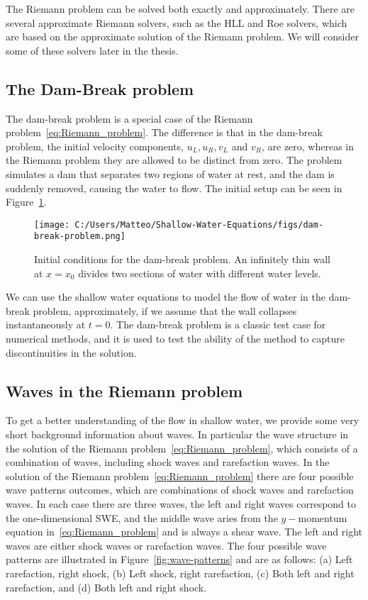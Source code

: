 The Riemann problem can be solved both exactly and approximately.
There are several approximate Riemann solvers, such as the HLL and Roe solvers, which are based on the approximate solution of the Riemann problem.
We will consider some of these solvers later in the thesis.


\subsection{The Dam-Break problem}
The dam-break problem is a special case of the Riemann problem~\eqref{eq:Riemann_problem}.
The difference is that in the dam-break problem, the initial velocity components, $u_L, u_R, v_L$ and $v_R$, are zero, whereas in the Riemann problem they are allowed to be distinct from zero.
The problem simulates a dam that separates two regions of water at rest, and the dam is suddenly removed, causing the water to flow.
The initial setup can be seen in Figure~\ref{fig:dam-break-problem}.
\begin{figure}[H]
    \centering
    \texttt{[image: C:/Users/Matteo/Shallow-Water-Equations/figs/dam-break-problem.png]}
    \caption{Initial conditions for the dam-break problem. An infinitely thin wall at $x=x_0$ divides two sections of water with different water levels.}\label{fig:dam-break-problem}
\end{figure}
We can use the shallow water equations to model the flow of water in the dam-break problem, approximately, if we assume that the wall collapses instantaneously at $t=0$.
The dam-break problem is a classic test case for numerical methods, and it is used to test the ability of the method to capture discontinuities in the solution.

\subsection{Waves in the Riemann problem}
To get a better understanding of the flow in shallow water, we provide some very short background information about waves.
In particular the wave structure in the solution of the Riemann problem~\eqref{eq:Riemann_problem}, which consists of a combination of waves, including shock waves and rarefaction waves.
In the solution of the Riemann problem~\eqref{eq:Riemann_problem} there are four possible wave patterns outcomes, which are combinations of shock waves and rarefaction waves.
In each case there are three waves, the left and right waves correspond to the one-dimensional SWE, and the middle wave aries from the $y-$momentum equation in~\eqref{eq:Riemann_problem} and is always a shear wave.
The left and right waves are either shock waves or rarefaction waves.
The four possible wave patterns are illustrated in Figure~\ref{fig:wave-patterns} and are as follows:
(a) Left rarefaction, right shock, (b) Left shock, right rarefaction, (c) Both left and right rarefaction, and (d) Both left and right shock.

